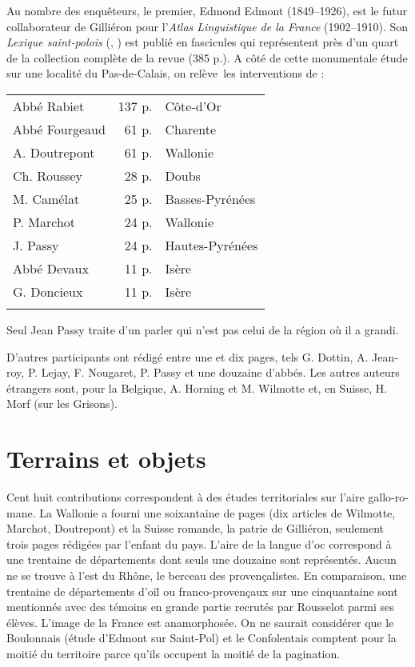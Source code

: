 \documentclass[output=paper]{../langscibook}
\begin{document}
\begin{otherlanguage}{french}
Au nombre des enquêteurs, le premier, Edmond Edmont (1849--1926), est le futur collaborateur de Gilliéron pour l’\textit{Atlas Linguistique de la France} (1902--1910). Son \textit{Lexique saint-polois} (\citeyear{edmont_lexique_1887}, \citeyear{edmont_lexique_1897}) est publié en fascicules qui représentent près d’un quart de la collection complète de la revue (385 p.). A côté de cette monumentale étude sur une localité du Pas-de-Calais, on relève~les interventions de :

\begin{tabular}{lrl}
Abbé Rabiet  &   137 p.   &  Côte-d’Or \\
Abbé Fourgeaud  &   61 p.  &  Charente \\
A. Doutrepont  &     61 p.  &  Wallonie \\
Ch. Roussey   &   28 p.  &  Doubs \\
M. Camélat  &    25 p.  &  Basses-Pyrénées \\
P. Marchot  &    24 p.  &  Wallonie \\
J. Passy    &  24 p.  &  Hautes-Pyrénées \\
Abbé Devaux    &   11 p.  &  Isère  \\
G. Doncieux   &   11 p.  &  Isère \\
  \lspbottomrule
 \end{tabular} 
 
Seul Jean Passy traite d’un parler qui n’est pas celui de la région où il a grandi.

D’autres participants ont rédigé entre une et dix pages, tels G. Dottin, A. Jeanroy, P. Lejay, F. Nougaret, P. Passy et une douzaine d’abbés. Les autres auteurs étrangers sont, pour la Belgique, A. Horning et M. Wilmotte et, en Suisse, H. Morf (sur les Grisons).

\section{Terrains et objets}

Cent huit contributions correspondent à des études territoriales sur l’aire gallo-romane. La Wallonie a fourni une soixantaine de pages (dix articles de Wilmotte, Marchot, Doutrepont) et la Suisse romande, la patrie de Gilliéron, seulement trois pages rédigées par l’enfant du pays. L’aire de la langue d’oc correspond à une trentaine de départements dont seuls une douzaine sont représentés. Aucun ne se trouve à l’est du Rhône, le berceau des provençalistes. En comparaison, une trentaine de départements d’oïl ou franco-provençaux sur une cinquantaine sont mentionnés avec des témoins en grande partie recrutés par Rousselot parmi ses élèves. L’image de la France est anamorphosée. On ne saurait considérer que le Boulonnais (étude d’Edmont sur Saint-Pol) et le Confolentais comptent pour la moitié du territoire parce qu’ils occupent la moitié de la pagination. 


\end{otherlanguage}
\end{document}
